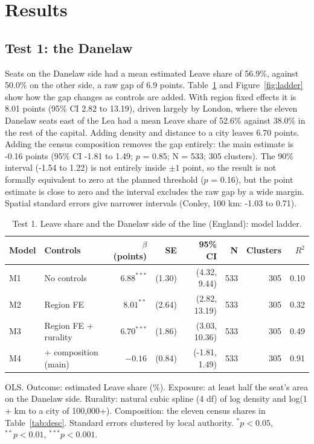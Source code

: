 \documentclass[11pt,a4paper]{article}
\begin{document}
\section{Results}\label{sec:results}
\subsection{Test 1: the Danelaw}
Seats on the Danelaw side had a mean estimated Leave share of 56.9\%, against 50.0\% on the other side, a raw gap of 6.9 points. Table~\ref{tab:t1} and Figure~\ref{fig:ladder} show how the gap changes as controls are added. With region fixed effects it is 8.01 points (95\% CI 2.82 to 13.19), driven largely by London, where the eleven Danelaw seats east of the Lea had a mean Leave share of 52.6\% against 38.0\% in the rest of the capital. Adding density and distance to a city leaves 6.70 points. Adding the census composition removes the gap entirely: the main estimate is -0.16 points (95\% CI -1.81 to 1.49; $p$ = 0.85; N = 533; 305 clusters). The 90\% interval (-1.54 to 1.22) is not entirely inside $\pm1$ point, so the result is not formally equivalent to zero at the planned threshold ($p$ = 0.16), but the point estimate is close to zero and the interval excludes the raw gap by a wide margin. Spatial standard errors give narrower intervals (Conley, 100 km: -1.03 to 0.71).

\begin{table}[tbp]\centering\footnotesize\caption{Test 1. Leave share and the Danelaw side of the line (England): model ladder.}\label{tab:t1}\begin{tabular}{llrrrrrr}\toprule Model & Controls & $\beta$ (points) & SE & 95\% CI & N & Clusters & $R^2$\\\midrule
M1 & No controls & $6.88^{***}$ & (1.30) & (4.32, 9.44) & 533 & 305 & 0.10\\
M2 & Region FE & $8.01^{**}$ & (2.64) & (2.82, 13.19) & 533 & 305 & 0.32\\
M3 & Region FE + rurality & $6.70^{***}$ & (1.86) & (3.03, 10.36) & 533 & 305 & 0.49\\
M4 & + composition (main) & $-0.16$ & (0.84) & (-1.81, 1.49) & 533 & 305 & 0.91\\
\bottomrule\end{tabular}\par\vspace{0.3em}\parbox{0.92\textwidth}{\scriptsize OLS. Outcome: estimated Leave share (\%). Exposure: at least half the seat's area on the Danelaw side. Rurality: natural cubic spline (4 df) of log density and log(1 + km to a city of 100,000+). Composition: the eleven census shares in Table~\ref{tab:desc}. Standard errors clustered by local authority. $^{*}p<0.05$, $^{**}p<0.01$, $^{***}p<0.001$.}\end{table}
\end{document}
